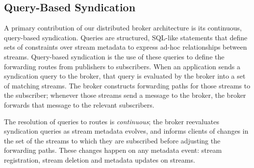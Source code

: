 %


\subsection{Query-Based Syndication}

A primary contribution of our distributed broker architecture is its continuous, query-based syndication.
Queries are structured, SQL-like statements that define sets of constraints over stream metadata to express ad-hoc relationships between streams.
Query-based syndication is the use of these queries to define the forwarding routes from publishers to subscribers.
When an application sends a syndication query to the broker, that query is evaluated by the broker into a set of matching streams.
The broker constructs forwarding paths for those streams to the subscriber; whenever those streams send a message to the broker, the broker forwards that message to the relevant subscribers.

The resolution of queries to routes is \emph{continuous}; the broker reevaluates syndication queries as stream metadata evolves, and informs clients of changes in the set of the streams to which they are subscribed before adjusting the forwarding paths.
These changes happen on any metadata event: stream registration, stream deletion and metadata updates on streams.

